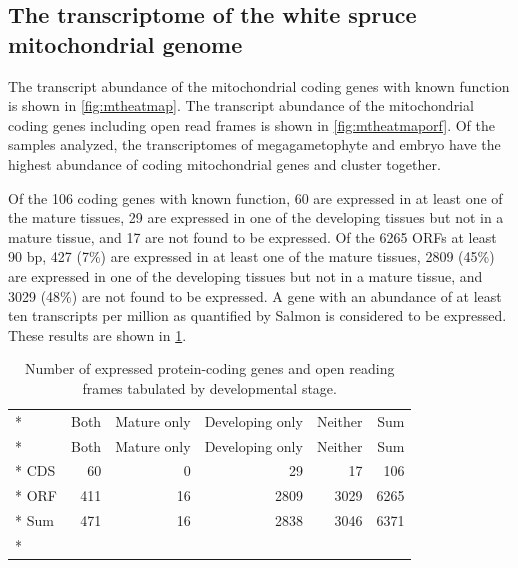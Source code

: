 \documentclass[
  12pt,
  oneside,
  openany]{book}
\begin{document}
\hypertarget{the-transcriptome-of-the-white-spruce-mitochondrial-genome}{%
\subsection{The transcriptome of the white spruce mitochondrial genome}\label{the-transcriptome-of-the-white-spruce-mitochondrial-genome}}

The transcript abundance of the mitochondrial coding genes with known function is shown in \cref{fig:mtheatmap}. The transcript abundance of the mitochondrial coding genes including open read frames is shown in \cref{fig:mtheatmaporf}. Of the samples analyzed, the transcriptomes of megagametophyte and embryo have the highest abundance of coding mitochondrial genes and cluster together.

Of the 106 coding genes with known function, 60 are expressed in at least one of the mature tissues, 29 are expressed in one of the developing tissues but not in a mature tissue, and 17 are not found to be expressed. Of the 6265 ORFs at least 90 bp, 427 (7\%) are expressed in at least one of the mature tissues, 2809 (45\%) are expressed in one of the developing tissues but not in a mature tissue, and 3029 (48\%) are not found to be expressed. A gene with an abundance of at least ten transcripts per million as quantified by Salmon is considered to be expressed. These results are shown in \cref{tbl:expressed}.

\hypertarget{tbl:expressed}{}
\begin{singlespace}
\small
\begin{longtable}[]{@{}lrrrrr@{}}
\caption[Number of expressed protein-coding genes and open reading frames tabulated by developmental stage.]{\label{tbl:expressed}Number of expressed protein-coding genes and open reading frames tabulated by developmental stage.}\tabularnewline*
\toprule
& Both & Mature only & Developing only & Neither & Sum\tabularnewline*
\midrule
\endfirsthead
\toprule
& Both & Mature only & Developing only & Neither & Sum\tabularnewline*
\midrule
\endhead
CDS & 60 & 0 & 29 & 17 & 106\tabularnewline*
ORF & 411 & 16 & 2809 & 3029 & 6265\tabularnewline*
Sum & 471 & 16 & 2838 & 3046 & 6371\tabularnewline*
\bottomrule
\end{longtable}
\end{singlespace}
\end{document}
